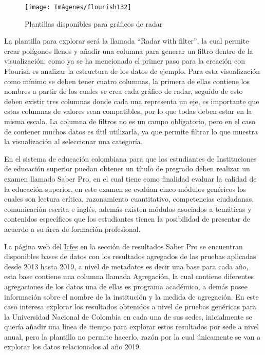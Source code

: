 \documentclass[
]{book}
\begin{document}
\begin{figure}

{\centering \texttt{[image: Imágenes/flourish132]} 

}

\caption{Plantillas disponibles para gráficos de radar}\label{fig:plantillasradarflourish-fig}
\end{figure}

La plantilla para explorar será la llamada ``Radar with filter'', la cual permite crear polígonos llenos y añadir una columna para generar un filtro dentro de la visualización; como ya se ha mencionado el primer paso para la creación con Flourish es analizar la estructura de los datos de ejemplo. Para esta visualización como mínimo se deben tener cuatro columnas, la primera de ellas contiene los nombres a partir de los cuales se crea cada gráfico de radar, seguido de esto deben existir tres columnas donde cada una representa un eje, es importante que estas columnas de valores sean compatibles, por lo que todas deben estar en la misma escala. La columna de filtros no es un campo obligatorio, pero en el caso de contener muchos datos es útil utilizarla, ya que permite filtrar lo que muestra la visualización al seleccionar una categoría.

En el sistema de educación colombiana para que los estudiantes de Instituciones de educación superior puedan obtener un título de pregrado deben realizar un examen llamado Saber Pro, en el cual tiene como finalidad evaluar la calidad de la educación superior, en este examen se evalúan cinco módulos genéricos los cuales son lectura crítica, razonamiento cuantitativo, competencias ciudadanas, comunicación escrita e inglés, además existen módulos asociados a temáticas y contenidos específicos que los estudiantes tienen la posibilidad de presentar de acuerdo a su área de formación profesional.

La página web del \href{https://www.icfes.gov.co/web/guest/acerca-del-examen-saber-pro}{Icfes} en la sección de resultados Saber Pro se encuentran disponibles bases de datos con los resultados agregados de las pruebas aplicadas desde 2013 hasta 2019, a nivel de metadatos es decir una base para cada año, esta base contiene una columna llamada Agregación, la cual contiene diferentes agregaciones de los datos una de ellas es programa académico, a demás posee información sobre el nombre de la institución y la medida de agregación. En este caso interesa explorar los resultados obtenidos a nivel de pruebas genéricas para la Universidad Nacional de Colombia en cada una de sus sedes, inicialmente se quería añadir una línea de tiempo para explorar estos resultados por sede a nivel anual, pero la plantilla no permite hacerlo, razón por la cual únicamente se van a explorar los datos relacionados al año 2019.
\end{document}
